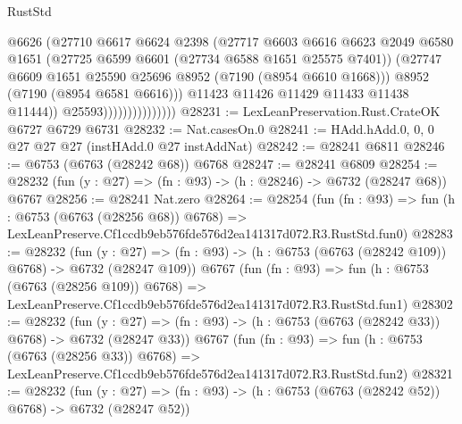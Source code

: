 \begin{lexlean}{RustStd}
\begin{coremodule}
                                    @6626
                                    (@27710
                                      @6617
                                      @6624
                                      @2398
                                      (@27717
                                        @6603
                                        @6616
                                        @6623
                                        @2049
                                        @6580
                                        @1651
                                        (@27725 @6599 @6601 (@27734 @6588 @1651 @25575 @7401))
                                        (@27747
                                          @6609
                                          @1651
                                          @25590
                                          @25696
                                          @8952
                                          (@7190 (@8954 @6610 @1668)))
                                        @8952
                                        (@7190 (@8954 @6581 @6616)))
                                      @11423
                                      @11426
                                      @11429
                                      @11433
                                      @11438
                                      @11444))
                                  @25593)))))))))))))))
@28231 := LexLeanPreservation.Rust.CrateOK @6727 @6729 @6731
@28232 := Nat.casesOn.{0}
@28241 := HAdd.hAdd.{0, 0, 0} @27 @27 @27 (instHAdd.{0} @27 instAddNat)
@28242 := @28241 @6811
@28246 := @6753 (@6763 (@28242 @68)) @6768
@28247 := @28241 @6809
@28254 := @28232 (fun (y : @27) => (fn : @93) -> (h : @28246) -> @6732 (@28247 @68)) @6767
@28256 := @28241 Nat.zero
@28264 := @28254
    (fun (fn : @93) =>
    fun (h : @6753 (@6763 (@28256 @68)) @6768) =>
    LexLeanPreserve.Cf1ccdb9eb576fde576d2ea141317d072.R3.RustStd.fun0)
@28283 := @28232
    (fun (y : @27) => (fn : @93) -> (h : @6753 (@6763 (@28242 @109)) @6768) -> @6732 (@28247 @109))
    @6767
    (fun (fn : @93) =>
    fun (h : @6753 (@6763 (@28256 @109)) @6768) =>
    LexLeanPreserve.Cf1ccdb9eb576fde576d2ea141317d072.R3.RustStd.fun1)
@28302 := @28232
    (fun (y : @27) => (fn : @93) -> (h : @6753 (@6763 (@28242 @33)) @6768) -> @6732 (@28247 @33))
    @6767
    (fun (fn : @93) =>
    fun (h : @6753 (@6763 (@28256 @33)) @6768) =>
    LexLeanPreserve.Cf1ccdb9eb576fde576d2ea141317d072.R3.RustStd.fun2)
@28321 := @28232
    (fun (y : @27) => (fn : @93) -> (h : @6753 (@6763 (@28242 @52)) @6768) -> @6732 (@28247 @52))

\end{coremodule}
\end{lexlean}
